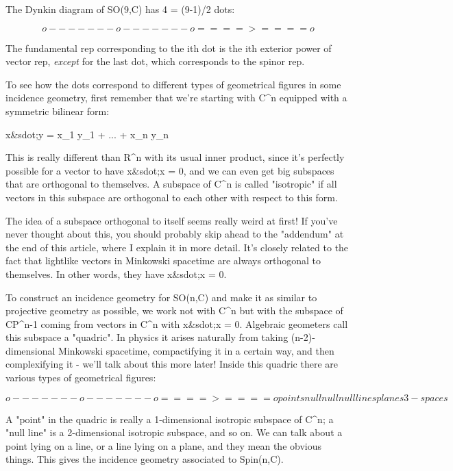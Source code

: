 The Dynkin diagram of SO(9,C) has 4 = (9-1)/2 dots:


$$
                 o-------o-------o====>====o 
$$
    
The fundamental rep corresponding to the ith dot is the
ith exterior power of vector rep, \emph{except} for the last dot, 
which corresponds to the spinor rep.  

To see how the dots correspond to different types of geometrical figures
in some incidence geometry, first remember that we're starting with 
C^{n} equipped with a symmetric bilinear form:

x&sdot;y = x_{1} y_{1} + ... + x_{n} y_{n}

This is really different than R^{n} with its usual inner product, since
it's perfectly possible for a vector to have x&sdot;x = 0, and we can even
get big subspaces that are orthogonal to themselves.  A subspace of 
C^{n} is called "isotropic" if all vectors in this 
subspace are orthogonal to 
each other with respect to this form.  


The idea of a subspace orthogonal to itself seems really weird at first!
If you've never thought about this, you should probably skip ahead to
the "addendum" at the end of this article, where I explain it in more
detail.  It's closely related to the fact that lightlike vectors in
Minkowski spacetime are always orthogonal to themselves.  In other
words, they have x&sdot;x = 0.

To construct an incidence geometry for SO(n,C) and make it as similar to
projective geometry as possible, we work not with C^{n} but with the
subspace of CP^{n-1} coming from vectors in C^{n} with 
x&sdot;x = 0.
Algebraic geometers call this subspace a "quadric".  
In physics it arises naturally from taking (n-2)-dimensional
Minkowski spacetime, compactifying it in a certain way, and then 
complexifying it - we'll talk about this more later!
Inside this quadric there are various types of geometrical figures:


$$
                 o-------o-------o====>====o 
            points     null     null      null
                      lines    planes    3-spaces
$$
    
A "point" in the quadric is really a 1-dimensional isotropic subspace 
of C^{n}; a "null line" is a 2-dimensional isotropic 
subspace, and 
so on.  We can talk about a point lying on a line, or a line lying on a plane,
and they mean the obvious things.  This gives the incidence geometry
associated to Spin(n,C).

